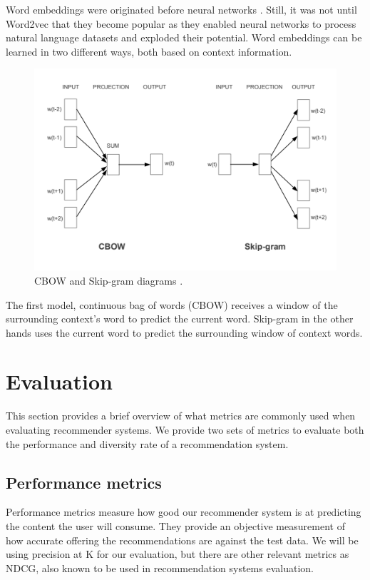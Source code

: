 \documentclass{kththesis}
\begin{document}
Word embeddings were originated before neural networks \cite{embeddingsPre1, embeddingsPre2, embeddingsPre3}. Still, it was not until Word2vec \cite{word2vec} that they become popular as they enabled neural networks to process natural language datasets and exploded their potential. Word embeddings can be learned in two different ways, both based on context information.

\begin{figure}[H]
    \centering
    \includegraphics[scale=0.6]{word2vec.PNG}
    \caption{CBOW and Skip-gram diagrams \cite{word2vec}.}
\end{figure}

The first model, continuous bag of words (CBOW) receives a window of the surrounding context's word to predict the current word. Skip-gram in the other hands uses the current word to predict the surrounding window of context words.


\section{Evaluation}
This section provides a brief overview of what metrics are commonly used when evaluating recommender systems. We provide two sets of metrics to evaluate both the performance and diversity rate of a recommendation system.
\subsection{Performance metrics}
Performance metrics measure how good our recommender system is at predicting the content the user will consume. They provide an objective measurement of how accurate offering the recommendations are against the test data. We will be using precision at K for our evaluation, but there are other relevant metrics as NDCG, also known to be used in recommendation systems evaluation.
\end{document}
